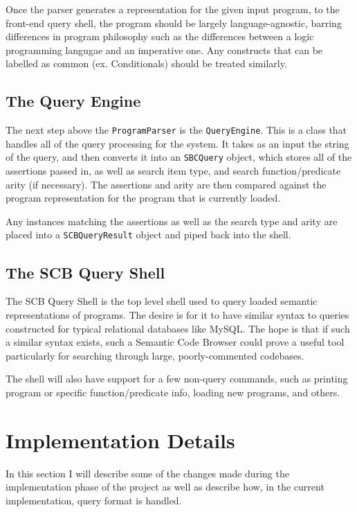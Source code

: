 \documentclass{article}
\begin{document}
Once the parser generates a representation for the given input program, to the front-end query shell, the program should be largely language-agnostic, barring differences in program philosophy such as the differences between a logic programming langugae and an imperative one. Any constructs that can be labelled as common (ex. Conditionals) should be treated similarly.

\subsection{The Query Engine}

The next step above the \texttt{ProgramParser} is the \texttt{QueryEngine}. This is a class that handles all of the query processing for the system. It takes as an input the string of the query, and then converts it into an \texttt{SBCQuery} object, which stores all of the assertions passed in, as well as search item type, and search function/predicate arity (if necessary). The assertions and arity are then compared against the program representation for the program that is currently loaded.

Any instances matching the assertions as well as the search type and arity are placed into a \texttt{SCBQueryResult} object and piped back into the shell.

\subsection{The SCB Query Shell}

The SCB Query Shell is the top level shell used to query loaded semantic representations of programs. The desire is for it to have similar syntax to queries constructed for typical relational databases like MySQL. The hope is that if such a similar syntax exists, such a Semantic Code Browser could prove a useful tool particularly for searching through large, poorly-commented codebases.

The shell will also have support for a few non-query commands, such as printing program or specific function/predicate info, loading new programs, and others.

\section{Implementation Details}

In this section I will describe some of the changes made during the implementation phase of the project as well as describe how, in the current implementation, query format is handled.
\end{document}
